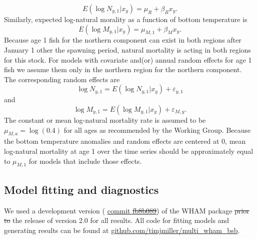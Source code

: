 \documentclass[
]{article}
\makeatletter
\providecommand{\DIFaddtex}[1]{{\protect\color{blue}\uwave{#1}}} %
\providecommand{\DIFdeltex}[1]{{\protect\color{red}\sout{#1}}} %
\providecommand{\DIFaddbegin}{} %
\providecommand{\DIFaddend}{} %
\providecommand{\DIFdelbegin}{} %
\providecommand{\DIFdelend}{} %
\providecommand{\DIFadd}[1]{\texorpdfstring{\DIFaddtex{#1}}{#1}} %
\providecommand{\DIFdel}[1]{\texorpdfstring{\DIFdeltex{#1}}{}} %
\newcommand{\DIFscaledelfig}{0.5}
\newlength{\DIFdelgraphicswidth} %
\newlength{\DIFdelgraphicsheight} %
\newcommand{\DIFaddincludegraphics}[2][]{{\color{blue}\fbox{\DIFOincludegraphics[#1]{#2}}}} %
\newcommand{\DIFdelincludegraphics}[2][]{%
\sbox{\DIFdelgraphicsbox}{\DIFOincludegraphics[#1]{#2}}%
\settoboxwidth{\DIFdelgraphicswidth}{\DIFdelgraphicsbox} %
\settoboxtotalheight{\DIFdelgraphicsheight}{\DIFdelgraphicsbox} %
\scalebox{\DIFscaledelfig}{%
\parbox[b]{\DIFdelgraphicswidth}{\usebox{\DIFdelgraphicsbox}\\[-\baselineskip] \rule{\DIFdelgraphicswidth}{0em}}\llap{\resizebox{\DIFdelgraphicswidth}{\DIFdelgraphicsheight}{%
\setlength{\unitlength}{\DIFdelgraphicswidth}%
\begin{picture}(1,1)%
\thicklines\linethickness{2pt} %
{\color[rgb]{1,0,0}\put(0,0){\framebox(1,1){}}}%
{\color[rgb]{1,0,0}\put(0,0){\line( 1,1){1}}}%
{\color[rgb]{1,0,0}\put(0,1){\line(1,-1){1}}}%
\end{picture}%
}\hspace*{3pt}}} %
} %
\DeclareRobustCommand{\DIFaddbegin}{\DIFOaddbegin \let\includegraphics\DIFaddincludegraphics} %
\DeclareRobustCommand{\DIFaddend}{\DIFOaddend \let\includegraphics\DIFOincludegraphics} %
\DeclareRobustCommand{\DIFdelbegin}{\DIFOdelbegin \let\includegraphics\DIFdelincludegraphics} %
\DeclareRobustCommand{\DIFdelend}{\DIFOaddend \let\includegraphics\DIFOincludegraphics} %
\let\sout@orig\sout %
\renewcommand{\sout}[1]{\ifmmode\text{\sout@orig{\ensuremath{#1}}}\else\sout@orig{#1}\fi} %
\makeatother
\begin{document}
\begin{equation}\label{eq:expected-recruitment}
E\left(\log N_{y,1}|x_y\right) = \mu_{R} + \beta_{R} x_y.
\end{equation}
Similarly, expected log-natural morality as a function of bottom temperature is
\begin{equation}\label{eq:expected-M1}
E\left(\log M_{y,1}|x_y\right) = \mu_{M,1} + \beta_{M} x_y.
\end{equation}
Because age 1 fish for the northern component can exist in both regions after January 1 other the spawning period, natural mortality is acting in both regions for this stock. For models with covariate and(or) annual random effects for age 1 fish we assume them only in the northern region for the northern component. The corresponding random effects are
\begin{equation}\label{eq:Rec-re}
\log N_{y,1} = E\left(\log N_{y,1}|x_y\right) + \varepsilon_{y,1}
\end{equation}
and
\begin{equation}\label{eq:M-re}
\log M_{y,1} = E\left(\log M_{y,1}|x_y\right) + \varepsilon_{M,y}.
\end{equation}
The constant or mean log-natural mortality rate is assumed to be \(\mu_{M,a} = \log(0.4)\) for all ages as recommended by the Working Group. Because the bottom temperature anomalies and random effects are centered at 0, mean log-natural mortality at age 1 over the time series should be approximately equal to \(\mu_{M,1}\) for models that include those effects.

\hypertarget{model-fitting-and-diagnostics}{%
\subsection*{Model fitting and diagnostics}\label{model-fitting-and-diagnostics}}

We used a development version (\DIFdelbegin %
\DIFdelend \DIFaddbegin \href{https://github.com/timjmiller/wham/tree/53e236b}{\DIFaddend commit \DIFdelbegin \DIFdel{fb8b089}\DIFdelend \DIFaddbegin \DIFadd{53e236b}\DIFaddend }) of the WHAM package \DIFdelbegin \DIFdel{prior to }\DIFdelend \DIFaddbegin \DIFadd{after }\DIFaddend the release of version 2.0 for all results. All code for fitting models and generating results can be found at \href{https://github.com/timjmiller/multi_wham_bsb}{github.com/timjmiller/multi\_wham\_bsb}.
\end{document}
